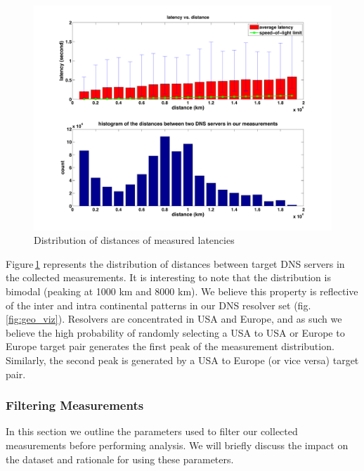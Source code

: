\begin{figure}[!tbh]
  \centering
  \includegraphics[width=\linewidth]{../figs/King_distance_distrbution.pdf}
  \caption{Distribution of distances of measured latencies}
  \label{fig:latency_distance_distribution}
\end{figure}

Figure\,\ref{fig:latency_distance_distribution} represents the distribution of distances between target DNS servers in the collected measurements. It is interesting to note that the distribution is bimodal (peaking at 1000 km and 8000 km). We believe this property is reflective of the inter and intra continental patterns in our DNS resolver set (fig.\,\ref{fig:geo_viz}). Resolvers are concentrated in USA and Europe, and as such we believe the high probability of randomly selecting a USA to USA or Europe to Europe target pair generates the first peak of the measurement distribution. Similarly, the second peak is generated by a USA to Europe (or vice versa) target pair.

\subsubsection{Filtering Measurements}
In this section we outline the parameters used to filter our collected measurements before performing analysis. We will briefly discuss the impact on the dataset and rationale for using these parameters.

